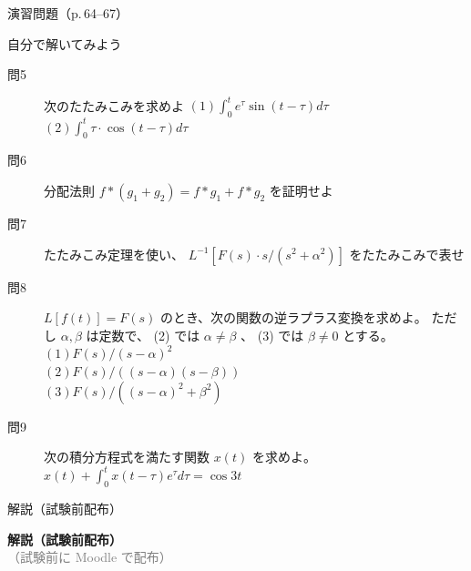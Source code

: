 \documentclass[aspectratio=43,professionalfonts,handout]{beamer}
\begin{document}
\begin{frame}{演習問題（p.\,64--67）}
  \begin{exampleblock}{自分で解いてみよう}
  \begin{description}
    \item[問5] 次のたたみこみを求めよ
    $(1) \int_{0}^t e^\tau \sin(t-\tau) d\tau$\\
    $(2) \int_{0}^t \tau\cdot \cos(t-\tau) d\tau$\\
    \item[問6] 分配法則 $f*(g_{1}+g_{2}) = f*g_{1} + f*g_{2}$ を証明せよ
    \item[問7] たたみこみ定理を使い、 $L^{-1}[F(s)\cdot s/(s^{2}+\alpha^{2})]$ をたたみこみで表せ
    \item[問8] $L[f(t)] = F(s)$ のとき、次の関数の逆ラプラス変換を求めよ。
    ただし $\alpha, \beta$ は定数で、 (2) では $\alpha \neq \beta$ 、 (3) では $\beta \neq 0$ とする。\\
    $(1) F(s)/(s-\alpha)^{2}$\\
    $(2) F(s)/((s-\alpha)(s-\beta))$\\
    $(3) F(s)/((s-\alpha)^{2}+\beta^{2})$\\
    \item[問9] 次の積分方程式を満たす関数 $x(t)$ を求めよ。
    $x(t) + \int_{0}^t x(t-\tau)e^\tau d\tau = \cos 3t$\\
  \end{description}
  \end{exampleblock}
\end{frame}

\begin{frame}{解説（試験前配布）}
  \vfill
  \begin{center}
  {\LARGE\bfseries\color{structure.fg} 解説（試験前配布）}\\[1em]
  {\normalsize\textcolor{gray}{（試験前に Moodle で配布）}}
  \end{center}
  \vfill
\end{frame}
\end{document}
